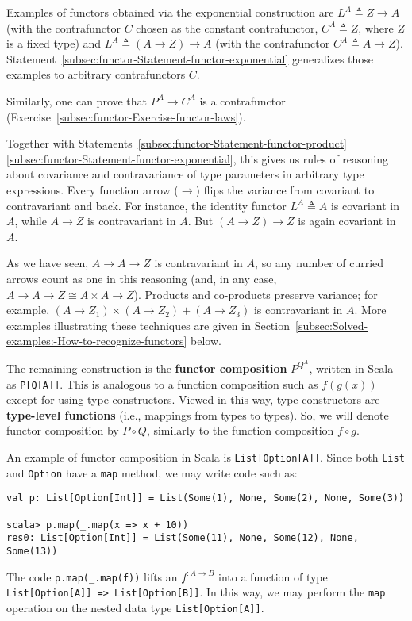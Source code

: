 Examples of functors obtained via the exponential
construction are $L^{A}\triangleq Z\rightarrow A$ (with the contrafunctor
$C$ chosen as the constant contrafunctor, $C^{A}\triangleq Z$, where
$Z$ is a fixed type) and $L^{A}\triangleq\left(A\rightarrow Z\right)\rightarrow A$
(with the contrafunctor $C^{A}\triangleq A\rightarrow Z$). Statement~\ref{subsec:functor-Statement-functor-exponential}
generalizes those examples to arbitrary contrafunctors $C$.

Similarly, one can prove that $P^{A}\rightarrow C^{A}$ is a contrafunctor
(Exercise~\ref{subsec:functor-Exercise-functor-laws}).

Together with Statements~\ref{subsec:functor-Statement-functor-product}\textendash \ref{subsec:functor-Statement-functor-exponential},
this gives us rules of reasoning about covariance and contravariance
of type parameters in arbitrary type expressions. Every function arrow
($\rightarrow$) flips the variance from covariant to contravariant
and back. For instance, the identity functor $L^{A}\triangleq A$
is covariant in $A$, while $A\rightarrow Z$ is contravariant in
$A$. But $\left(A\rightarrow Z\right)\rightarrow Z$ is again covariant
in $A$. 

As we have seen, $A\rightarrow A\rightarrow Z$ is contravariant in
$A$, so any number of curried arrows count as one in this reasoning
(and, in any case, $A\rightarrow A\rightarrow Z\cong A\times A\rightarrow Z$).
Products and co-products preserve variance; for example, $\left(A\rightarrow Z_{1}\right)\times\left(A\rightarrow Z_{2}\right)+\left(A\rightarrow Z_{3}\right)$
is contravariant in $A$. More examples illustrating these techniques
are given in Section~\ref{subsec:Solved-examples:-How-to-recognize-functors}
below.

The remaining construction is the \textbf{functor composition}
$P^{Q^{A}}$, written in Scala as \lstinline!P[Q[A]]!. This is analogous
to a function composition such as $f(g(x))$ except for using type
constructors. Viewed in this way, type constructors are \textbf{type-level
functions} (i.e., mappings from types
to types). So, we will denote functor composition by $P\circ Q$,
similarly to the function composition $f\circ g$.

An example of functor composition in Scala is \lstinline!List[Option[A]]!.
Since both \lstinline!List! and \lstinline!Option! have a \lstinline!map!
method, we may write code such as:
\begin{lstlisting}
val p: List[Option[Int]] = List(Some(1), None, Some(2), None, Some(3))

scala> p.map(_.map(x => x + 10))
res0: List[Option[Int]] = List(Some(11), None, Some(12), None, Some(13)) 
\end{lstlisting}
The code \lstinline!p.map(_.map(f))! lifts an $f^{:A\rightarrow B}$
into a function of type \lstinline!List[Option[A]] => List[Option[B]]!.
In this way, we may perform the \lstinline!map! operation on the
nested data type \lstinline!List[Option[A]]!. 

